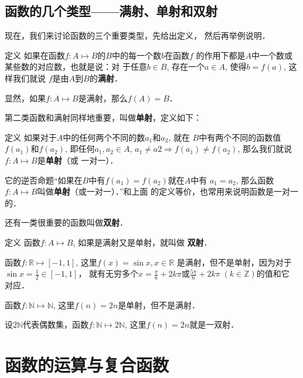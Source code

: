 \subsection{函数的几个类型——满射、单射和双射}
现在，我们来讨论函数的三个重要类型，先给出定义，
然后再举例说明．

\begin{blk}{定义 }
   如果在函数$f:A\mapsto B$的$B$中的每一个数$b$在函数$f$
的作用下都是$A$中一个数或某些数的对应数，也就是说：对
于任意$b\in B$, 存在一个$a\in A$, 使得$b=f(a)$, 这样我们就说
$f$是由$A$到$B$的\textbf{满射}．
\end{blk}

显然，如果$f:A\mapsto B$是满射，那么$f(A)=B$．

第二类函数和满射同样地重要，叫做\textbf{单射}，定义如下：

\begin{blk}{定义}
    如果对于$A$中的任何两个不同的数$a_1$和$a_2$, 就在
$B$中有两个不同的函数值$f(a_1)$和$f(a_2)$, 即任何$a_1,a_2\in A$,
$a_1\ne a2\Rightarrow f(a_1)\ne f(a_2)$, 那么我们就说$f:A\mapsto B$是\textbf{单射}（或
一对一）．
\end{blk}

 
它的逆否命题“如果在$B$中有$f(a_1)=f(a_2)$就在$A$中有
$a_1=a_2$, 那么函数$f:A\mapsto B$叫做\textbf{单射}（或一对一）．”和上面
的定义等价，也常用来说明函数是一对一的．

还有一类很重要的函数叫做\textbf{双射}．

\begin{blk}{定义}
    函数$f:A\mapsto B$, 如果是满射又是单射，就叫做
    \textbf{双射}．
\end{blk}

\begin{example}
    函数$f:\mathbb{R}\mapsto [-1,1]$, 这里$f(x)=\sin x, x\in\mathbb{R}$
是满射，但不是单射，因为对于
$\sin x=\frac{1}{2}\in [-1,1]$，
就有无穷多个$x=\frac{\pi}{6}+2k\pi$或$\frac{5\pi}{6}+2k\pi\;(k\in\mathbb{Z})$的值和它
对应．
\end{example}

\begin{example}
    函数$f:\mathbb{N}\mapsto\mathbb{N}$, 这里$f(n)=2n$是单射，但不是满射．
\end{example}

\begin{example}
    设$2\mathbb{N}$代表偶数集，函数$f:\mathbb{N}\mapsto 2 \mathbb{N}$, 这里$f(n)=2n$就是一双射．
\end{example}

\section{函数的运算与复合函数}

